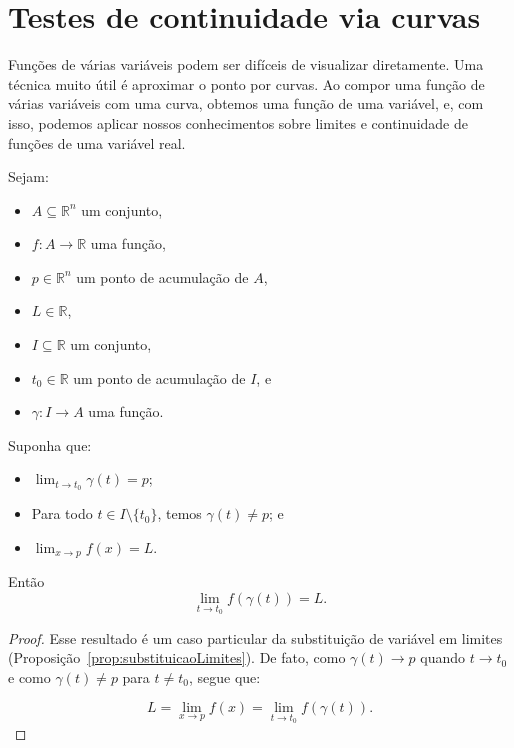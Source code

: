 \section{Testes de continuidade via curvas}

Funções de várias variáveis podem ser difíceis de visualizar diretamente.
Uma técnica muito útil é aproximar o ponto por curvas.
Ao compor uma função de várias variáveis com uma curva, obtemos uma função de uma variável, e, com isso, podemos aplicar nossos conhecimentos sobre limites e continuidade de funções de uma variável real.

\begin{proposition}
    Sejam:
    \begin{itemize}
        \item $A\subseteq\mathbb R^n$ um conjunto,
        \item $f:A\to\mathbb R$ uma função,
        \item $p\in\mathbb R^n$ um ponto de acumulação de $A$,
        \item $L\in\mathbb R$,
        \item $I\subseteq\mathbb R$ um conjunto,
        \item $t_0\in\mathbb R$ um ponto de acumulação de $I$, e
        \item $\gamma:I\to A$ uma função.
    \end{itemize}

    Suponha que:
    \begin{itemize}
        \item $\lim_{t\to t_0}\gamma(t)=p$;
        \item Para todo $t\in I\setminus\{t_0\}$, temos $\gamma(t)\neq p$; e
        \item $\lim_{x\to p}f(x)=L$.
    \end{itemize}

    Então
    \[
        \lim_{t\to t_0}f(\gamma(t))=L.
    \]
\end{proposition}

\begin{proof}Esse resultado é um caso particular da substituição de variável em limites (Proposição~\ref{prop:substituicaoLimites}).
De fato, como $\gamma(t)\to p$ quando $t\to t_0$ e como $\gamma(t)\neq p$ para $t\neq t_0$, segue que:

\[
    L=\lim_{x\to p}f(x)=\lim_{t\to t_0}f(\gamma(t)).
\]
\end{proof}

